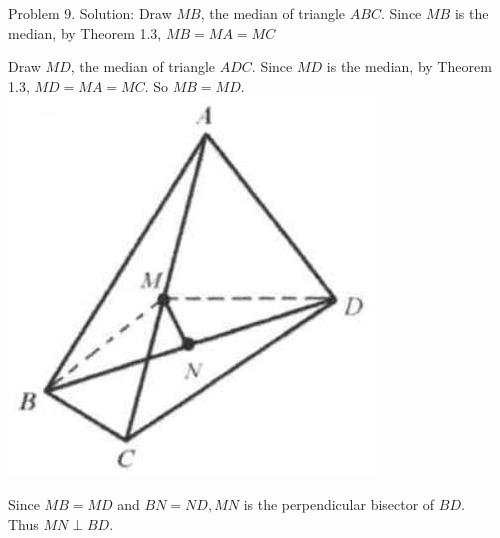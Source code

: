 \documentclass[10pt]{article}
\begin{document}
Problem 9. Solution:
Draw \(M B\), the median of triangle \(A B C\). Since \(M B\) is the median, by Theorem 1.3, \(M B=M A=M C\)

Draw \(M D\), the median of triangle \(A D C\). Since \(M D\) is the median, by Theorem 1.3, \(M D=M A=M C\). So \(M B=M D\).\\
\includegraphics[max width=\textwidth, center]{2025_04_17_97bc1f7e44d93c271a88g-020(1)}


Since \(M B=M D\) and \(B N=N D, M N\) is the perpendicular bisector of \(B D\).\\
Thus \(M N \perp B D\).
\end{document}

